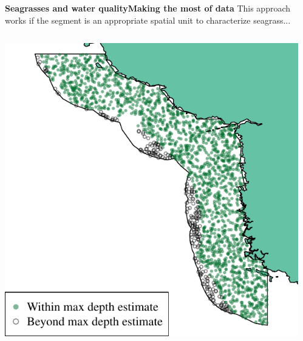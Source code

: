 \documentclass[serif]{beamer}\usepackage[]{graphicx}\usepackage[]{color}
\makeatletter
\def\maxwidth{ %
  \ifdim\Gin@nat@width>\linewidth
    \linewidth
  \else
    \Gin@nat@width
  \fi
}
\newenvironment{knitrout}{}{} %
\makeatother
\begin{document}
\begin{frame}{\textbf{Seagrasses and water quality}}{\textbf{Making the most of data}}
\onslide<+->
This approach works if the segment is an appropriate spatial unit to characterize seagrass...
\begin{columns}[T]
\onslide<+->
\begin{column}{0.45\textwidth}
\begin{knitrout}
\color{fgcolor}

{\centering \includegraphics[width=\maxwidth]{fig//docfail1} 

}



\end{knitrout}
\end{column}
\onslide<+->
\begin{column}{0.45\textwidth}
\begin{knitrout}
\color{fgcolor}


\end{knitrout}
\end{column}
\end{columns}
\end{frame}
\end{document}
